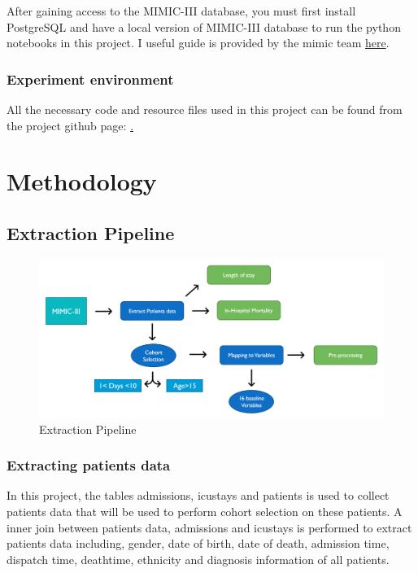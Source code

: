 \documentclass{l4proj}
\begin{document}
After gaining access to the MIMIC-III database, you must first install PostgreSQL and have a local version of MIMIC-III database to run the python notebooks in this project. I useful guide is provided by the mimic team \href{https://mimic.mit.edu/docs/gettingstarted/local/install-mimic-locally-windows/}{here}.

\subsection{Experiment environment}
All the necessary code and resource files used in this project can be found from the project github page: \href{https://github.com/llhtoby/MIMIC-III-ML}.


\chapter{Methodology}
    
\section{Extraction Pipeline}

\begin{figure}[h!]
  \caption{Extraction Pipeline}
  \includegraphics[width=\textwidth]{dissertation/Latex/images/Extraction pipeline.PNG}
\end{figure}



\subsection{Extracting patients data} 
    In this project, the tables admissions, icustays and patients is used to collect patients data that will be used to perform cohort selection on these patients. A inner join between patients data, admissions and icustays is performed to extract patients data including, gender, date of birth, date of death, admission time, dispatch time, deathtime, ethnicity and diagnosis information of all patients. 
    
\end{document}
